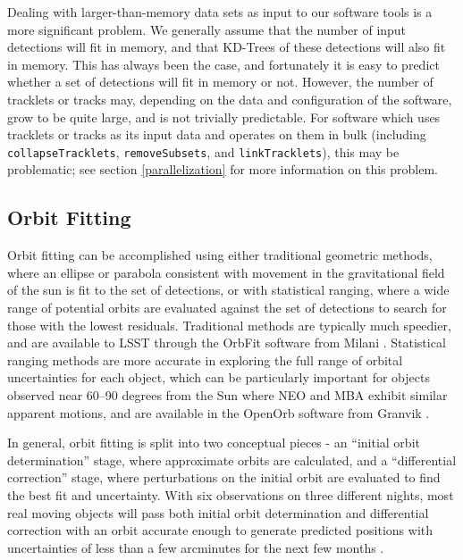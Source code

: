Dealing with larger-than-memory data sets as input to our software
tools is a more significant problem.  We generally assume that the
number of input detections will fit in memory, and that KD-Trees of
these detections will also fit in memory.  This has always been the
case, and fortunately it is easy to predict whether a set of
detections will fit in memory or not.  However, the number of
tracklets or tracks may, depending on the data and configuration of
the software, grow to be quite large, and is not trivially
predictable.  For software which uses tracklets or tracks as its input
data and operates on them in bulk (including {\tt collapseTracklets},
{\tt removeSubsets}, and {\tt linkTracklets}), this may be problematic;
see section \ref{parallelization} for more information on this
problem.




\subsection{Orbit Fitting}
\label{orbitFitting}

Orbit fitting can be accomplished using either traditional geometric
methods, where an ellipse or parabola consistent with movement in the
gravitational field of the sun is fit to the set of detections, or
with statistical ranging, where a wide range of potential orbits are
evaluated against the set of detections to search for those with
the lowest residuals. Traditional methods are typically much speedier,
and are available to LSST through the OrbFit software from Milani
\citep{Milani2006}. Statistical ranging methods are more accurate in
exploring the full range of orbital uncertainties for each object,
which can be particularly important for objects observed near 60--90
degrees from the Sun where NEO and MBA exhibit similar apparent
motions, and are available in the OpenOrb software from Granvik
\citep{OpenOrb2009}.

In general, orbit fitting is split into two conceptual pieces - an
``initial orbit determination'' stage, where approximate orbits are
calculated, and a ``differential correction'' stage, where
perturbations on the initial orbit are evaluated to find the best fit
and uncertainty. With six observations on three different nights, most
real moving objects will pass both initial orbit determination and
differential correction with an orbit accurate enough to generate
predicted positions with uncertainties of less than a few arcminutes
for the next few months \citep{basicSolarSystem}.





